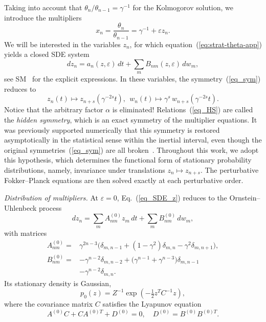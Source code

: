 \documentclass[aps,twocolumn,superscriptaddress]{revtex4-2}
\begin{document}
Taking into account that $\theta_n/\theta_{n-1}=\gamma^{-1}$ for the Kolmogorov solution, we introduce the multipliers
\begin{equation}
x_n=\frac{\theta_n}{\theta_{n-1}}=\gamma^{-1}+\varepsilon z_n.
\label{eq_mult}
\end{equation}
We will be interested in the variables $z_n$, for which equation~(\ref{eq:strat-theta-app}) yields a closed SDE system
\begin{equation}
dz_n = a_n(z,\varepsilon)\,dt+\sum_{m} B_{nm}(z,\varepsilon)\,dw_m,
\label{eq_SDE_z}
\end{equation}
see SM~\cite[\S I]{SM} for the explicit expressions.
In these variables, the symmetry~(\ref{eq_sym}) reduces to
\begin{equation}
z_n(t) \mapsto z_{n+s}(\gamma^{-2s}t),
\ \
w_n(t) \mapsto \gamma^s\,w_{n+s}(\gamma^{-2s}t).



\label{eq_HS}
\end{equation}
Notice that the arbitrary factor $\alpha$ is eliminated! Relations~(\ref{eq_HS}) are called the \emph{hidden symmetry}, which is an exact symmetry of the multiplier equations. It was previously supported numerically that this symmetry is restored asymptotically in the statistical sense within the inertial interval, even though the original symmetries~(\ref{eq_sym}) are all broken~\cite{thalabard2024zero}. Throughout this work, we adopt this hypothesis, which determines the functional form of stationary probability distributions, namely, invariance under translations $z_n\mapsto z_{n+s}$. The perturbative Fokker--Planck equations are then solved exactly at each perturbative order.

\textit{Distribution of multipliers.}
At $\varepsilon=0$, Eq.~(\ref{eq_SDE_z}) reduces to the Ornstein--Uhlenbeck process
\begin{equation}
dz_n = \sum_m A_{nm}^{(0)} z_m\,dt + \sum_m B_{nm}^{(0)}\,dw_m,
\end{equation}
with matrices
\begin{align}
A_{nm}^{(0)}
= & \gamma^{2n-3}\bigl(
\delta_{m,n-1}+(1-\gamma^2)\delta_{m,n}-\gamma^2\delta_{m,n+1}
\bigr), \\
B_{nm}^{(0)}
= &
-\gamma^{n-2}\delta_{m,n-2}
+\bigl(\gamma^{n-1}+\gamma^{n-3}\bigr)\delta_{m,n-1}
\nonumber \\&
-\gamma^{n-2}\delta_{m,n}.
\label{eq_SDE_aBM}
\end{align}
Its stationary density is Gaussian,
\begin{equation}
\label{eq:Gaussian}
p_0(z)=Z^{-1}\exp\!\left(-\tfrac12 z^T C^{-1} z\right),
\end{equation}
where the covariance matrix $C$ satisfies the Lyapunov equation
\begin{equation}
\label{eq_for_C_inf}
A^{(0)}C+CA^{(0)T}+D^{(0)}=0, \quad D^{(0)}=B^{(0)}B^{(0)T}.
\end{equation}
\end{document}
